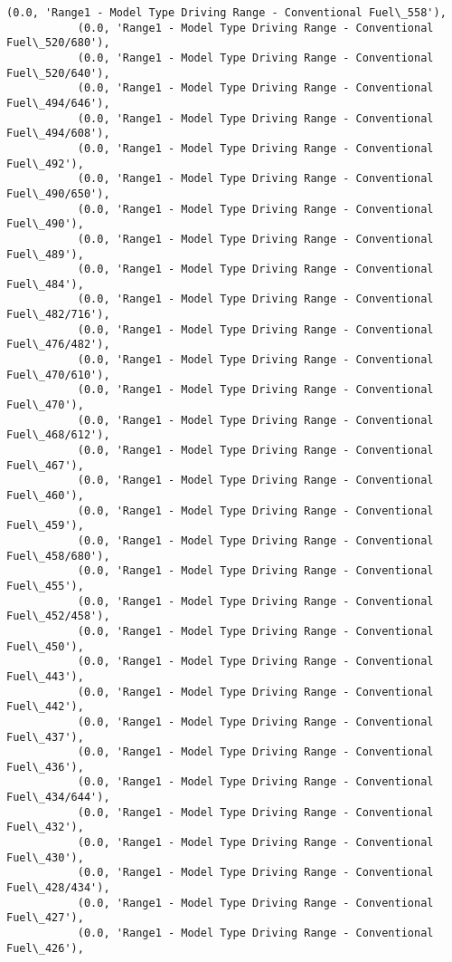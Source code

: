 \documentclass[11pt]{article}
\begin{document}
\begin{Verbatim}[commandchars=\\\{\}]
           (0.0, 'Range1 - Model Type Driving Range - Conventional Fuel\_558'),
           (0.0, 'Range1 - Model Type Driving Range - Conventional Fuel\_520/680'),
           (0.0, 'Range1 - Model Type Driving Range - Conventional Fuel\_520/640'),
           (0.0, 'Range1 - Model Type Driving Range - Conventional Fuel\_494/646'),
           (0.0, 'Range1 - Model Type Driving Range - Conventional Fuel\_494/608'),
           (0.0, 'Range1 - Model Type Driving Range - Conventional Fuel\_492'),
           (0.0, 'Range1 - Model Type Driving Range - Conventional Fuel\_490/650'),
           (0.0, 'Range1 - Model Type Driving Range - Conventional Fuel\_490'),
           (0.0, 'Range1 - Model Type Driving Range - Conventional Fuel\_489'),
           (0.0, 'Range1 - Model Type Driving Range - Conventional Fuel\_484'),
           (0.0, 'Range1 - Model Type Driving Range - Conventional Fuel\_482/716'),
           (0.0, 'Range1 - Model Type Driving Range - Conventional Fuel\_476/482'),
           (0.0, 'Range1 - Model Type Driving Range - Conventional Fuel\_470/610'),
           (0.0, 'Range1 - Model Type Driving Range - Conventional Fuel\_470'),
           (0.0, 'Range1 - Model Type Driving Range - Conventional Fuel\_468/612'),
           (0.0, 'Range1 - Model Type Driving Range - Conventional Fuel\_467'),
           (0.0, 'Range1 - Model Type Driving Range - Conventional Fuel\_460'),
           (0.0, 'Range1 - Model Type Driving Range - Conventional Fuel\_459'),
           (0.0, 'Range1 - Model Type Driving Range - Conventional Fuel\_458/680'),
           (0.0, 'Range1 - Model Type Driving Range - Conventional Fuel\_455'),
           (0.0, 'Range1 - Model Type Driving Range - Conventional Fuel\_452/458'),
           (0.0, 'Range1 - Model Type Driving Range - Conventional Fuel\_450'),
           (0.0, 'Range1 - Model Type Driving Range - Conventional Fuel\_443'),
           (0.0, 'Range1 - Model Type Driving Range - Conventional Fuel\_442'),
           (0.0, 'Range1 - Model Type Driving Range - Conventional Fuel\_437'),
           (0.0, 'Range1 - Model Type Driving Range - Conventional Fuel\_436'),
           (0.0, 'Range1 - Model Type Driving Range - Conventional Fuel\_434/644'),
           (0.0, 'Range1 - Model Type Driving Range - Conventional Fuel\_432'),
           (0.0, 'Range1 - Model Type Driving Range - Conventional Fuel\_430'),
           (0.0, 'Range1 - Model Type Driving Range - Conventional Fuel\_428/434'),
           (0.0, 'Range1 - Model Type Driving Range - Conventional Fuel\_427'),
           (0.0, 'Range1 - Model Type Driving Range - Conventional Fuel\_426'),

\end{Verbatim}
\end{document}
